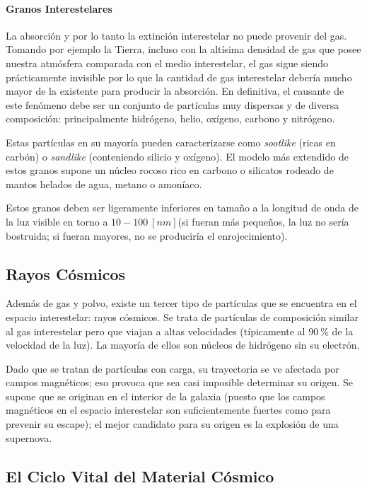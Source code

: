 \documentclass{tufte-handout}
\begin{document}
\paragraph{Granos Interestelares}

La absorción y por lo tanto la extinción interestelar no puede provenir del gas. Tomando por ejemplo la Tierra, incluso con la altísima densidad de gas que posee nuestra atmósfera comparada con el medio interestelar, el gas sigue siendo prácticamente invisible por lo que la cantidad de gas interestelar debería mucho mayor de la existente para producir la absorción. En definitiva, el causante de este fenómeno debe ser un conjunto de partículas muy dispersas y de diversa composición: principalmente hidrógeno, helio, oxígeno, carbono y nitrógeno.

Estas partículas en su mayoría pueden caracterizarse como \emph{sootlike} (ricas en carbón) o \emph{sandlike} (conteniendo silicio y oxígeno). El modelo más extendido de estos granos supone un núcleo rocoso rico en carbono o silicatos rodeado de mantos helados de agua, metano o amoníaco.

Estos granos deben ser ligeramente inferiores en tamaño a la longitud de onda de la luz visible en torno a $10-100~[nm]$(si fueran más pequeños, la luz no sería bostruida; si fueran mayores, no se produciría el enrojecimiento).

\subsection{Rayos Cósmicos}

Además de gas y polvo, existe un tercer tipo de partículas que se encuentra en el espacio interestelar: rayos cósmicos. Se trata de partículas de composición similar al gas interestelar pero que viajan a altas velocidades (típicamente al $90~\%$ de la velocidad de la luz). La mayoría de ellos son núcleos de hidrógeno sin su electrón.

Dado que se tratan de partículas con carga, su trayectoria se ve afectada por campos magnéticos; eso provoca que sea casi imposible determinar su origen. Se supone que se originan en el interior de la galaxia (puesto que los campos magnéticos en el espacio interestelar son suficientemente fuertes como para prevenir su escape); el mejor candidato para su origen es la explosión de una supernova.

\subsection{El Ciclo Vital del Material Cósmico}
\end{document}
